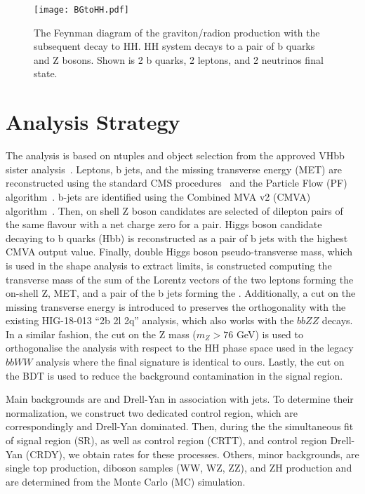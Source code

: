 \begin{figure}[!htb]%
  \begin{center}
    \texttt{[image: BGtoHH.pdf]}
    \caption{ The Feynman diagram of the graviton/radion production with the subsequent decay to HH. HH system decays to a pair of b quarks and Z bosons. Shown is 2 b quarks, 2 leptons, and 2 neutrinos final state.
    }
    \label{fig:BGtoHH}
  \end{center}
\end{figure}


\section{Analysis Strategy}

The analysis is based on ntuples and object selection from the approved VHbb sister analysis~\cite{VHbb_inspire}. Leptons, b jets, and the missing transverse energy (MET) are reconstructed using the standard CMS procedures~\cite{CMSreco} and the Particle Flow (PF) algorithm~\cite{PFalgo}. b-jets are identified using the Combined MVA v2 (CMVA) algorithm~\cite{BTagtwiki}. Then, on shell Z boson candidates are selected of dilepton pairs of the same flavour with a net charge zero for a pair. Higgs boson candidate decaying to b quarks (Hbb) is reconstructed as a pair of b jets with the highest CMVA output value. Finally, double Higgs boson pseudo-transverse mass, which is used in the shape analysis to extract limits, is constructed computing the transverse mass of the sum of the Lorentz vectors of the two leptons forming the on-shell Z, MET, and a pair of the b jets forming the \HBB. Additionally, a cut on the missing transverse energy is introduced to preserves the orthogonality with the existing HIG-18-013 ``2b 2l 2q'' analysis, which also works with the $bbZZ$ decays. In a similar fashion, the cut on the Z mass ($m_Z > 76$ GeV) is used to orthogonalise the analysis with respect to the HH phase space used in the legacy $bbWW$ analysis where the final signature is identical to ours. Lastly, the cut on the BDT is used to reduce the background contamination in the signal region.

Main backgrounds are \ttbar and Drell-Yan in association with jets. To determine their normalization, we construct two dedicated control region, which are correspondingly \ttbar and Drell-Yan dominated. Then, during the the simultaneous fit of signal region (SR), as well as control region \ttbar (CRTT), and control region Drell-Yan (CRDY), we obtain rates for these processes. Others, minor backgrounds, are single top production, diboson samples (WW, WZ, ZZ), and ZH production and are determined from the Monte Carlo (MC) simulation. 

